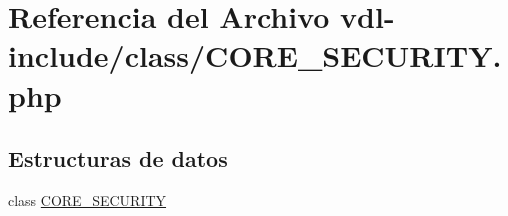 \hypertarget{CORE__SECURITY_8php}{\section{Referencia del Archivo vdl-\/include/class/\-C\-O\-R\-E\-\_\-\-S\-E\-C\-U\-R\-I\-T\-Y.php}
\label{CORE__SECURITY_8php}
}
\subsection*{Estructuras de datos}
\begin{DoxyCompactItemize}
\item 
class \hyperlink{classCORE__SECURITY}{C\-O\-R\-E\-\_\-\-S\-E\-C\-U\-R\-I\-T\-Y}
\end{DoxyCompactItemize}
